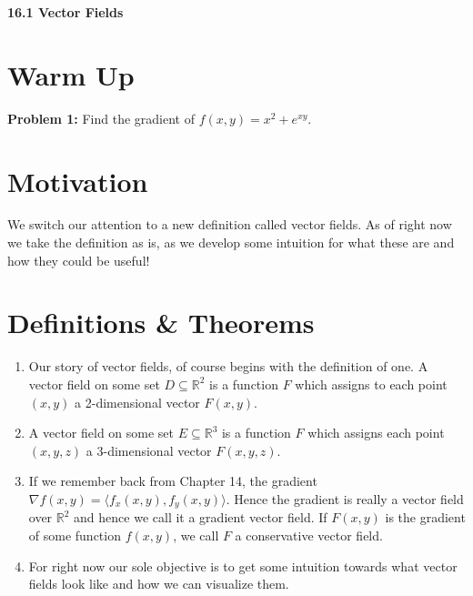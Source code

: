 \documentclass[11pt]{article}
\newcommand{\vs}{\vspace*{.1in}}
\begin{document}
\begin{LARGE}\begin{center}\bf 16.1 Vector Fields\end{center}
\end{LARGE}

\vs\vs



\section{Warm Up}
\textbf{Problem 1:} Find the gradient of $f(x,y) = x^2 + e^{xy}$.

\section{Motivation}
We switch our attention to a new definition called vector fields. As of right now we take the definition as is, as we develop some intuition for what these are and how they could be useful!



\section{Definitions \& Theorems}

\begin{enumerate}
\item Our story of vector fields, of course begins with the definition of one. A vector field on some set  $D\subseteq \mathbb{R}^2$ is a function $F$ which assigns to each point $(x,y)$ a 2-dimensional vector $F(x,y)$.

\item A vector field on some set $E\subseteq \mathbb{R}^3$ is a function $F$ which assigns each point $(x,y,z)$ a 3-dimensional vector $F(x,y,z)$.


\item If we remember back from Chapter 14, the gradient $\nabla f(x,y) = \langle f_x(x,y), f_y(x,y)\rangle$. Hence the gradient is really a vector field over $\mathbb{R}^2$ and hence we call it a gradient vector field. If $F(x,y)$ is the gradient of some function $f(x,y)$, we call $F$ a conservative vector field.

\item For right now our sole objective is to get some intuition towards what vector fields look like and how we can visualize them. 
\end{enumerate}
\end{document}
